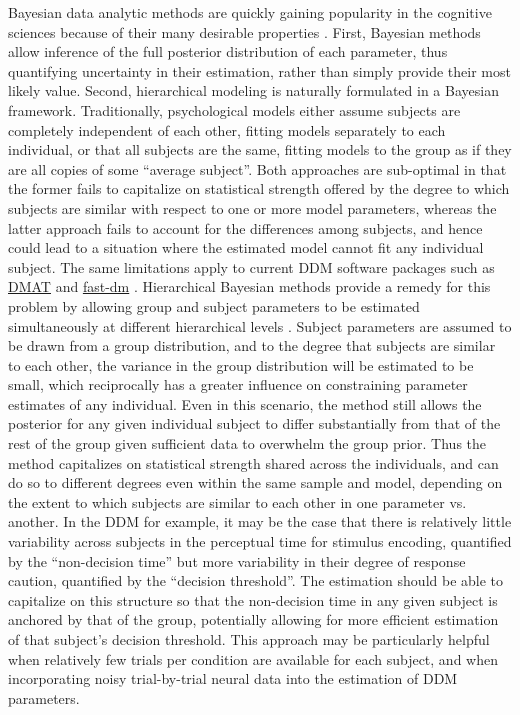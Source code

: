 \documentclass[letterpaper,10pt,english]{article}
\begin{document}
Bayesian data analytic methods are quickly gaining popularity in the
cognitive sciences because of their many desirable properties
\citep{LeeWagenmakers13,Kruschke10}. First, Bayesian methods allow
inference of the full posterior distribution of each parameter, thus
quantifying uncertainty in their estimation, rather than simply
provide their most likely value. Second, hierarchical modeling is
naturally formulated in a Bayesian framework. Traditionally,
psychological models either assume subjects are completely independent
of each other, fitting models separately to each individual, or that
all subjects are the same, fitting models to the group as if they are
all copies of some ``average subject''. Both approaches are
sub-optimal in that the former fails to capitalize on statistical
strength offered by the degree to which subjects are similar with
respect to one or more model parameters, whereas the latter approach
fails to account for the differences among subjects, and hence could
lead to a situation where the estimated model cannot fit any
individual subject. The same limitations apply to current DDM software
packages such as
\href{http://ppw.kuleuven.be/okp/software/dmat/}{DMAT}
\citep{VandekerckhoveTuerlinckx08} and
\href{http://seehuhn.de/pages/fast-dm}{fast-dm}
\citep{VossVoss07}. Hierarchical Bayesian methods provide a remedy for
this problem by allowing group and subject parameters to be estimated
simultaneously at different hierarchical levels
\citep{LeeWagenmakers13,Kruschke10,VandekerckhoveTuerlinckxLee11}.
Subject parameters are assumed to be drawn from a group distribution,
and to the degree that subjects are similar to each other, the
variance in the group distribution will be estimated to be small,
which reciprocally has a greater influence on constraining parameter
estimates of any individual. Even in this scenario, the method still
allows the posterior for any given individual subject to differ
substantially from that of the rest of the group given sufficient data
to overwhelm the group prior. Thus the method capitalizes on
statistical strength shared across the individuals, and can do so to
different degrees even within the same sample and model, depending on
the extent to which subjects are similar to each other in one
parameter vs. another. In the DDM for example, it may be the case that
there is relatively little variability across subjects in the
perceptual time for stimulus encoding, quantified by the
``non-decision time'' but more variability in their degree of response
caution, quantified by the ``decision threshold''. The estimation
should be able to capitalize on this structure so that the
non-decision time in any given subject is anchored by that of the
group, potentially allowing for more efficient estimation of that
subject's decision threshold. This approach may be particularly
helpful when relatively few trials per condition are available for
each subject, and when incorporating noisy trial-by-trial neural data
into the estimation of DDM parameters.
\end{document}
